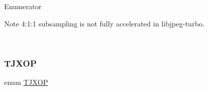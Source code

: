 \begin{DoxyEnumFields}{Enumerator}
\begin{DoxyNote}{Note}
4\+:1\+:1 subsampling is not fully accelerated in libjpeg-\/turbo. 
\end{DoxyNote}
\\
\hline

\end{DoxyEnumFields}
\mbox{\label{group___turbo_j_p_e_g_ga2de531af4e7e6c4f124908376b354866}} 
\subsubsection{\texorpdfstring{T\+J\+X\+OP}{TJXOP}}
{\footnotesize\ttfamily enum \hyperlink{group___turbo_j_p_e_g_ga2de531af4e7e6c4f124908376b354866}{T\+J\+X\+OP}}

